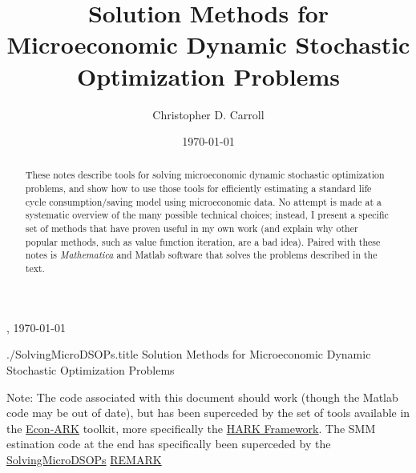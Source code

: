 \documentclass[titlepage]{\econtex}
\providecommand{\textname}{SolvingMicroDSOPs}
\begin{document}
\hfill{\tiny \jobname, \today}

\begin{verbatimwrite}{./\textname.title}
  Solution Methods for Microeconomic Dynamic Stochastic Optimization Problems
\end{verbatimwrite}

\title{Solution Methods for Microeconomic Dynamic Stochastic Optimization Problems}

\author{Christopher D. Carroll\authNum}


\date{\today}
\maketitle

\noindent  Note: The code associated with this document should work (though the Matlab code may be out of date), but has been superceded by the set of tools available in the \href{https://github.com/econ-ark/HARK}{Econ-ARK} toolkit, more specifically the \href{https://github.com/econ-ark/HARK}{HARK Framework}.  The SMM estination code at the end has specifically been superceded by the \href{https://github.com/econ-ark/REMARK/tree/master/REMARKs/SolvingMicroDSOPs}{SolvingMicroDSOPs} \href{https://github.com/econ-ark/REMARK}{REMARK}


\hypertarget{Abstract}{}
\begin{abstract}
  These notes describe tools for solving microeconomic dynamic
  stochastic optimization problems, and show how to use those tools
  for efficiently estimating a standard life cycle consumption/saving model
  using microeconomic data.  No attempt is made at a systematic
  overview of the many possible technical choices; instead, I present
  a specific set of methods that have proven useful in my own work
  (and explain why other popular methods, such as value function
  iteration, are a bad idea).  Paired with these notes is \textit{Mathematica} and Matlab software that solves the problems
  described in the text.
\end{abstract}
\end{document}
